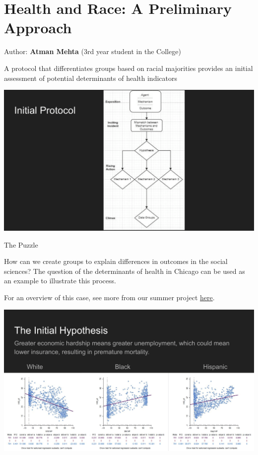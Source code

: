 \documentclass[
]{book}
\begin{document}
\hypertarget{health-and-race-a-preliminary-approach}{%
\section{Health and Race: A Preliminary Approach}\label{health-and-race-a-preliminary-approach}}

Author: \textbf{Atman Mehta} (3rd year student in the College)

A protocol that differentiates groups based on racial majorities provides an initial assessment of potential determinants of health indicators

\includegraphics{images/health1.png}

The Puzzle

How can we create groups to explain differences in outcomes in the social sciences? The question of the determinants of health in Chicago can be used as an example to illustrate this process.

For an overview of this case, see more from our summer project \href{https://uchicago.box.com/s/ganfzzmzonoaqc1of2kzzkw67pgg7csw}{here}.

\includegraphics{images/health2.png}
\end{document}
